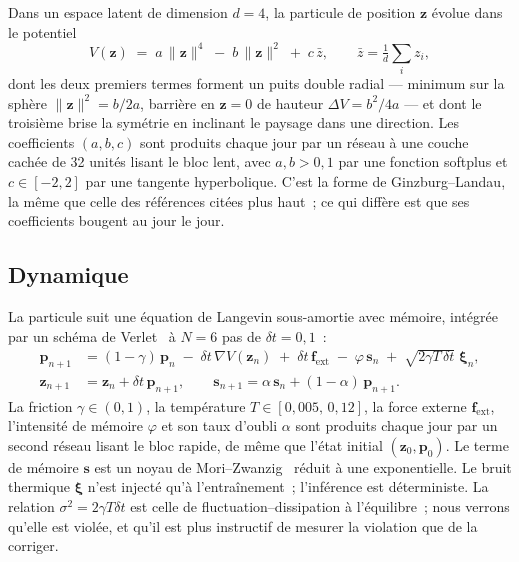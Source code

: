 \documentclass[11pt,a4paper]{article}
\newcommand{\dV}{\Delta V}
\begin{document}
Dans un espace latent de dimension $d=4$, la particule de position $\mathbf{z}$ évolue dans le potentiel
\begin{equation}
V(\mathbf{z}) \;=\; a\,\lVert\mathbf{z}\rVert^{4} \;-\; b\,\lVert\mathbf{z}\rVert^{2} \;+\; c\,\bar{z},
\qquad \bar z = \tfrac{1}{d}\textstyle\sum_i z_i ,
\label{eq:potential}
\end{equation}
dont les deux premiers termes forment un puits double radial --- minimum sur la sphère $\lVert\mathbf z\rVert^2 = b/2a$, barrière en $\mathbf z = 0$ de hauteur $\dV = b^2/4a$ --- et dont le troisième brise la symétrie en inclinant le paysage dans une direction. Les coefficients $(a,b,c)$ sont produits chaque jour par un réseau à une couche cachée de 32 unités lisant le bloc lent, avec $a,b>0{,}1$ par une fonction softplus et $c\in[-2,2]$ par une tangente hyperbolique. C'est la forme de Ginzburg--Landau, la même que celle des références citées plus haut~; ce qui diffère est que ses coefficients bougent au jour le jour.

\subsection{Dynamique}

La particule suit une équation de Langevin sous-amortie avec mémoire, intégrée par un schéma de Verlet~\cite{verlet1967} à $N=6$ pas de $\delta t = 0{,}1$~:
\begin{align}
\mathbf p_{n+1} &= (1-\gamma)\,\mathbf p_n \;-\; \delta t\,\nabla V(\mathbf z_n) \;+\; \delta t\,\mathbf f_{\mathrm{ext}} \;-\; \varphi\,\mathbf s_n \;+\; \sqrt{2\gamma T\,\delta t}\;\boldsymbol\xi_n, \\
\mathbf z_{n+1} &= \mathbf z_n + \delta t\,\mathbf p_{n+1}, \qquad
\mathbf s_{n+1} = \alpha\,\mathbf s_n + (1-\alpha)\,\mathbf p_{n+1}.
\end{align}
La friction $\gamma\in(0,1)$, la température $T\in[0{,}005,\,0{,}12]$, la force externe $\mathbf f_{\mathrm{ext}}$, l'intensité de mémoire $\varphi$ et son taux d'oubli $\alpha$ sont produits chaque jour par un second réseau lisant le bloc rapide, de même que l'état initial $(\mathbf z_0,\mathbf p_0)$. Le terme de mémoire $\mathbf s$ est un noyau de Mori--Zwanzig~\cite{mori1965,zwanzig1961} réduit à une exponentielle. Le bruit thermique $\boldsymbol\xi$ n'est injecté qu'à l'entraînement~; l'inférence est déterministe. La relation $\sigma^2 = 2\gamma T\delta t$ est celle de fluctuation--dissipation à l'équilibre~; nous verrons qu'elle est violée, et qu'il est plus instructif de mesurer la violation que de la corriger.
\end{document}
